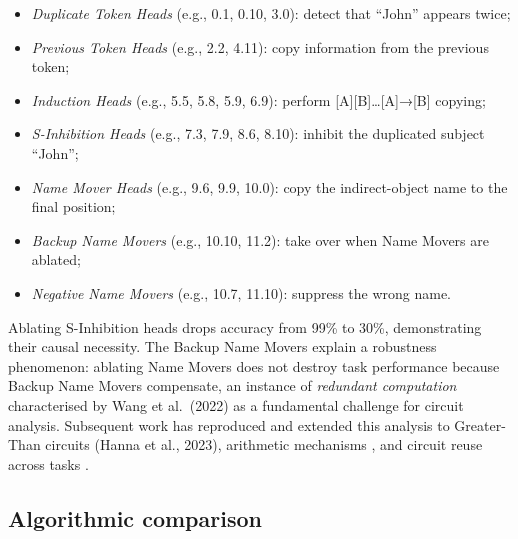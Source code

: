 \documentclass{article}
\begin{document}
\begin{itemize}

\item
  \emph{Duplicate Token Heads} (e.g., 0.1, 0.10, 3.0): detect that ``John'' appears twice;
\item
  \emph{Previous Token Heads} (e.g., 2.2, 4.11): copy information from the previous token;
\item
  \emph{Induction Heads} (e.g., 5.5, 5.8, 5.9, 6.9): perform {[}A{]}{[}B{]}\ldots{[}A{]}→{[}B{]} copying;
\item
  \emph{S-Inhibition Heads} (e.g., 7.3, 7.9, 8.6, 8.10): inhibit the duplicated subject ``John'';
\item
  \emph{Name Mover Heads} (e.g., 9.6, 9.9, 10.0): copy the indirect-object name to the final position;
\item
  \emph{Backup Name Movers} (e.g., 10.10, 11.2): take over when Name Movers are ablated;
\item
  \emph{Negative Name Movers} (e.g., 10.7, 11.10): suppress the wrong name.
\end{itemize}

Ablating S-Inhibition heads drops accuracy from 99\% to 30\%, demonstrating their causal necessity. The Backup Name Movers explain a robustness phenomenon: ablating Name Movers does not destroy task performance because Backup Name Movers compensate, an instance of \emph{redundant computation} characterised by Wang et al.~(2022) as a fundamental challenge for circuit analysis. Subsequent work has reproduced and extended this analysis to Greater-Than circuits (Hanna et al., 2023), arithmetic mechanisms \citep{yu2024interpretingarithm}, and circuit reuse across tasks \citep{merullo2023circuitcomponentre}.

\subsection{Algorithmic comparison}\label{algorithmic-comparison}
\end{document}
